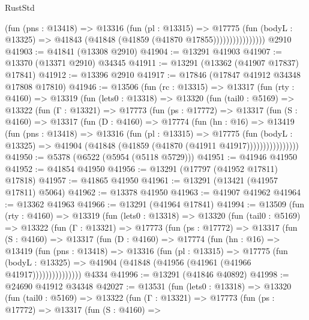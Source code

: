 \begin{lexlean}{RustStd}
\begin{coremodule}
                        (fun (pns : @13418) =>
                        @13316
                          (fun (pl : @13315) =>
                          @17775
                            (fun (bodyL : @13325) =>
                            @41843 (@41848 (@41859 (@41870 @17855))))))))))))))))
    @2910
@41903 := @41841 (@13308 @2910)
@41904 := @13291 @41903
@41907 := @13370 (@13371 @2910) @34345
@41911 := @13291 (@13362 (@41907 @17837) @17841)
@41912 := @13396 @2910
@41917 := @17846 (@17847 @41912 @34348 @17808 @17810)
@41946 := @13506
    (fun (rc : @13315) =>
    @13317
      (fun (rty : @4160) =>
      @13319
        (fun (lets0 : @13318) =>
        @13320
          (fun (tail0 : @5169) =>
          @13322
            (fun (Γ : @13321) =>
            @17773
              (fun (ps : @17772) =>
              @13317
                (fun (S : @4160) =>
                @13317
                  (fun (D : @4160) =>
                  @17774
                    (fun (hn : @16) =>
                    @13419
                      (fun (pns : @13418) =>
                      @13316
                        (fun (pl : @13315) =>
                        @17775
                          (fun (bodyL : @13325) =>
                          @41904 (@41848 (@41859 (@41870 (@41911 @41917))))))))))))))))
@41950 := @5378 (@6522 (@5954 (@5118 @5729)))
@41951 := @41946 @41950
@41952 := @41854 @41950
@41956 := @13291 (@17797 (@41952 @17811) @17818)
@41957 := @41865 @41950
@41961 := @13291 (@13421 (@41957 @17811) @5064)
@41962 := @13378 @41950
@41963 := @41907 @41962
@41964 := @13362 @41963
@41966 := @13291 (@41964 @17841)
@41994 := @13509
    (fun (rty : @4160) =>
    @13319
      (fun (lets0 : @13318) =>
      @13320
        (fun (tail0 : @5169) =>
        @13322
          (fun (Γ : @13321) =>
          @17773
            (fun (ps : @17772) =>
            @13317
              (fun (S : @4160) =>
              @13317
                (fun (D : @4160) =>
                @17774
                  (fun (hn : @16) =>
                  @13419
                    (fun (pns : @13418) =>
                    @13316
                      (fun (pl : @13315) =>
                      @17775
                        (fun (bodyL : @13325) =>
                        @41904 (@41848 (@41956 (@41961 (@41966 @41917)))))))))))))))
    @4334
@41996 := @13291 (@41846 @40892)
@41998 := @24690 @41912 @34348
@42027 := @13531
    (fun (lets0 : @13318) =>
    @13320
      (fun (tail0 : @5169) =>
      @13322
        (fun (Γ : @13321) =>
        @17773
          (fun (ps : @17772) =>
          @13317
            (fun (S : @4160) =>

\end{coremodule}
\end{lexlean}
